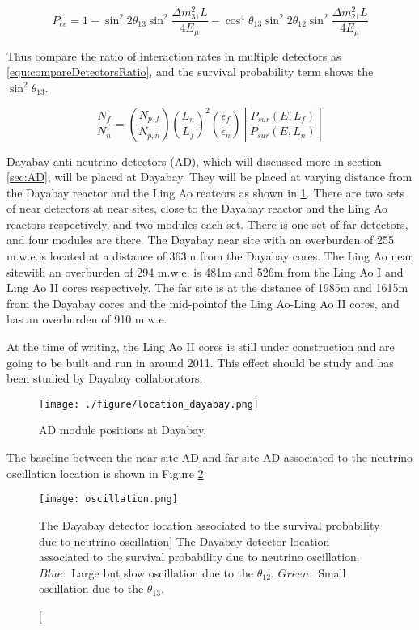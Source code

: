 \begin{equation}
\label{equ:survivalProb}
P_{ee} = 1 - \sin^{2}{2\theta_{13}}\sin^{2}{\frac{{\Delta}m^{2}_{31}L}{4E_{\mu}}} - \cos^{4}{\theta_{13}}\sin^{2}{2\theta_{12}}\sin^{2}{\frac{{\Delta}m^{2}_{21}L}{4E_{\mu}}}
\end{equation}


Thus compare the ratio of interaction rates in multiple detectors as \ref{equ:compareDetectorsRatio}, and
the survival probability term shows the $\sin^{2}{\theta_{13}}$.


\begin{equation}
\label{equ:compareDetectorsRatio}
\frac{N_{f}}{N_{n}} = (\frac{N_{p,f}}{N_{p,n}})(\frac{L_n}{L_f})^{2}(\frac{\epsilon_f}{\epsilon_n})[\frac{P_{sur}(E,L_f)}{P_{sur}(E,L_n)}]
\end{equation}


Dayabay anti-neutrino detectors (AD), which will discussed more in section \ref{sec:AD},
will be placed at Dayabay. They will be placed at varying distance from the Dayabay reactor and
the Ling Ao reatcors as shown in \ref{fig:location_dayabay.png}. There are two sets of near detectors
at near sites, close to the Dayabay reactor and the Ling Ao reactors respectively, and two modules each set.
There is one set of far detectors, and four modules are there. The Dayabay near site with an overburden of
255 m.w.e.is located at a distance of 363m from the Dayabay cores. The Ling Ao near sitewith an overburden of
294 m.w.e. is 481m and 526m from the Ling Ao I and Ling Ao II cores respectively. The far site is at the distance
of 1985m and 1615m from the Dayabay cores and the mid-pointof the Ling Ao-Ling Ao II cores, and has an overburden
of 910 m.w.e.

At the time of writing, the Ling Ao II cores is still under construction and are going to be built and run in around
2011. This effect should be study and has been studied by Dayabay collaborators.


\begin{figure}[h]
    \centering
    \texttt{[image: ./figure/location\_dayabay.png]}
    \caption{AD module positions at Dayabay.}
    \label{fig:location_dayabay.png}
    \end{figure}


The baseline between the near site AD and far site AD associated to the neutrino oscillation
location is shown in Figure \ref{fig:oscillation}


\begin{figure}
    \label{fig:oscillation}
    \centering
    \texttt{[image: oscillation.png]}
    \caption
    [The Dayabay detector location associated to the survival probability due to neutrino oscillation]
    {The Dayabay detector location associated to the survival probability due to neutrino oscillation.
$Blue:$ Large but slow oscillation due to the $\theta_{12}$. $Green:$ Small oscillation due to the $\theta_{13}$.}
    \end{figure}





